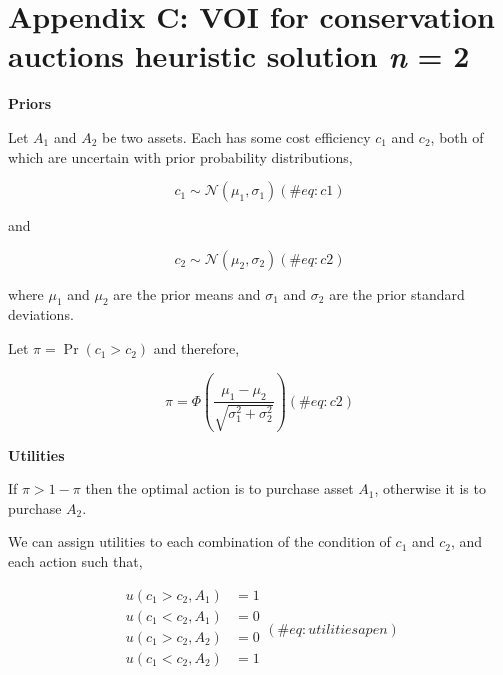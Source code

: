\newpage

\captionsetup{labelformat=empty}

\section*{\texorpdfstring{Appendix C: VOI for conservation auctions
heuristic solution \emph{n} =
2}{Appendix C: VOI for conservation auctions heuristic solution n = 2}}\label{appendix-c-voi-for-conservation-auctions-heuristic-solution-n-2}

\textbf{Priors}

Let \(A_1\) and \(A_2\) be two assets. Each has some cost efficiency
\(c_1\) and \(c_2\), both of which are uncertain with prior probability
distributions,

\begin{equation}
c_1\sim\mathcal{N}(\mu_1, \sigma_1)
(\#eq:c1)
\end{equation}

and

\begin{equation}
c_2\sim\mathcal{N}(\mu_2, \sigma_2)
(\#eq:c2)
\end{equation}

where \(\mu_1\) and \(\mu_2\) are the prior means and \(\sigma_1\) and
\(\sigma_2\) are the prior standard deviations.

Let \(\pi=\Pr(c_1 > c_2)\) and therefore,

\begin{equation}
\pi = \Phi\left(\frac{\mu_1-\mu_2}{\sqrt{\sigma^2_1+\sigma^2_2}}\right)
(\#eq:c2)
\end{equation}

\textbf{Utilities}

If \(\pi > 1 - \pi\) then the optimal action is to purchase asset
\(A_1\), otherwise it is to purchase \(A_2\).

We can assign utilities to each combination of the condition of \(c_1\)
and \(c_2\), and each action such that,

\begin{equation}
\begin{aligned}
u(c_1 > c_2, A_1)&=1\\
u(c_1 < c_2, A_1)&=0\\
u(c_1 > c_2, A_2)&=0\\
u(c_1 < c_2, A_2)&=1\\
\end{aligned}
(\#eq:utilitiesapen)
\end{equation}

